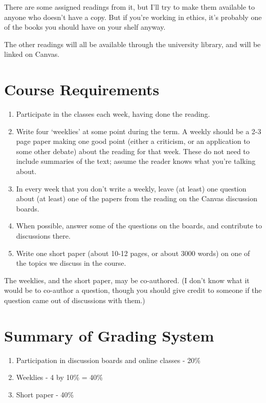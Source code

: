 \documentclass[
]{article}
\providecommand{\tightlist}{%
  \setlength{\itemsep}{0pt}\setlength{\parskip}{0pt}}
\begin{document}
There are some assigned readings from it, but I'll try to make them
available to anyone who doesn't have a copy. But if you're working in
ethics, it's probably one of the books you should have on your shelf
anyway.

The other readings will all be available through the university library,
and will be linked on Canvas.

\hypertarget{course-requirements}{%
\section{Course Requirements}\label{course-requirements}}

\begin{enumerate}
\def\labelenumi{\arabic{enumi}.}
\tightlist
\item
  Participate in the classes each week, having done the reading.
\item
  Write four `weeklies' at some point during the term. A weekly should
  be a 2-3 page paper making one good point (either a criticism, or an
  application to some other debate) about the reading for that week.
  These do not need to include summaries of the text; assume the reader
  knows what you're talking about.
\item
  In every week that you don't write a weekly, leave (at least) one
  question about (at least) one of the papers from the reading on the
  Canvas discussion boards.
\item
  When possible, answer some of the questions on the boards, and
  contribute to discussions there.
\item
  Write one short paper (about 10-12 pages, or about 3000 words) on one
  of the topics we discuss in the course.
\end{enumerate}

The weeklies, and the short paper, may be co-authored. (I don't know
what it would be to co-author a question, though you should give credit
to someone if the question came out of discussions with them.)

\hypertarget{summary-of-grading-system}{%
\section{Summary of Grading System}\label{summary-of-grading-system}}

\begin{enumerate}
\def\labelenumi{\arabic{enumi}.}
\tightlist
\item
  Participation in discussion boards and online classes - 20\%
\item
  Weeklies - 4 by 10\% = 40\%
\item
  Short paper - 40\%
\end{enumerate}
\end{document}
